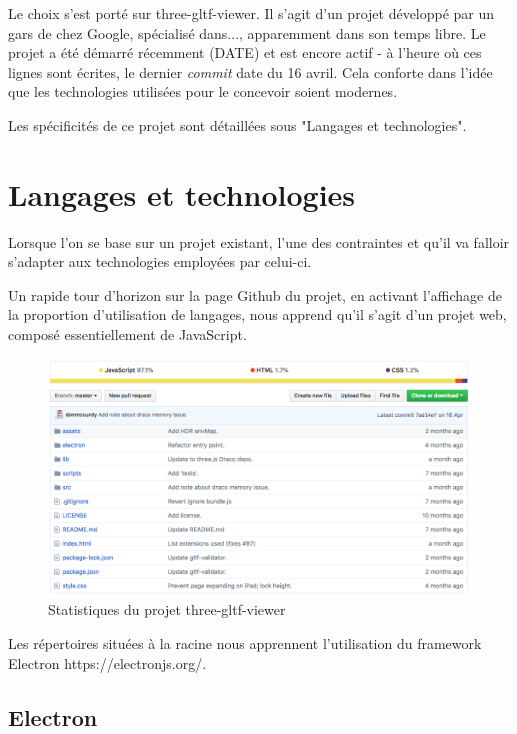Le choix s'est porté sur three-gltf-viewer.
Il s'agit d'un projet développé par un gars de chez Google, spécialisé dans...,  apparemment dans son temps libre.
Le projet a été démarré récemment (DATE) et est encore actif - à l'heure où ces lignes sont écrites, le dernier \textit{commit} date du 16 avril. Cela conforte dans l'idée que les technologies utilisées pour le concevoir soient modernes.

Les spécificités de ce projet sont détaillées sous "Langages et technologies".


\section{Langages et technologies}

Lorsque l'on se base sur un projet existant, l'une des contraintes et qu'il va falloir s'adapter aux technologies employées par celui-ci.

Un rapide tour d'horizon sur la page Github du projet, en activant l'affichage de la proportion d'utilisation de langages, nous apprend qu'il s'agit d'un projet web, composé essentiellement de JavaScript.

\begin{figure}[h]
    \centering
    \includegraphics[width=\linewidth]{Figures/three-gltf-viewer-github-preview.png}
    \caption{Statistiques du projet three-gltf-viewer}
    \label{fig:three-gltf-viewer-github-preview}
\end{figure}

Les répertoires situées à la racine nous apprennent l'utilisation du framework Electron https://electronjs.org/.
\subsection{Electron}

